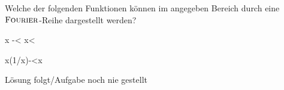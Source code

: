 \documentclass{atistandalonetask}
\begin{document}
  \begin{atiTask}[
    title = \textsc{Dirichlet}-Bedingungen
  ]
  
  Welche der folgenden Funktionen können im angegeben Bereich durch eine $\textsc{Fourier}$-Reihe dargestellt werden?
  \begin{atiSubequations}
  \item{\tan x \quad -\infty < x< \infty}
  \item{x\sin\left(1/x\right)\quad -<x\leq {}}
  \end{atiSubequations}
  \end{atiTask}
  \begin{atiSolution}
   	Lösung folgt/Aufgabe noch nie gestellt
   	
  \end{atiSolution}
\end{document}
